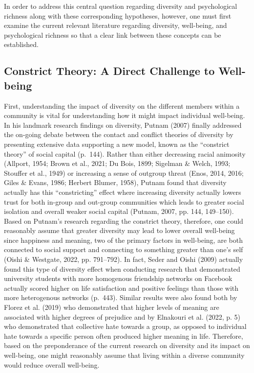 \documentclass[
  man,floatsintext]{apa7}
\begin{document}
In order to address this central question regarding diversity and psychological richness along with these corresponding hypotheses, however, one must first examine the current relevant literature regarding diversity, well-being, and psychological richness so that a clear link between these concepts can be established.

\hypertarget{constrict-theory-a-direct-challenge-to-well-being}{%
\subsection{Constrict Theory: A Direct Challenge to Well-being}\label{constrict-theory-a-direct-challenge-to-well-being}}

First, understanding the impact of diversity on the different members within a community is vital for understanding how it might impact individual well-being. In his landmark research findings on diversity,
Putnam (2007) finally addressed the on-going debate between the contact and conflict theories of diversity by presenting extensive data supporting a new model, known as the ``constrict theory'' of social capital (p.~144). Rather than either decreasing racial animosity (Allport, 1954; Brown et al., 2021; Du Bois, 1899; Sigelman \& Welch, 1993; Stouffer et al., 1949) or increasing a sense of outgroup threat (Enos, 2014, 2016; Giles \& Evans, 1986; Herbert Blumer, 1958), Putnam found that diversity actually has this ``constricting'' effect where increasing diversity actually lowers trust for both in-group and out-group communities which leads to greater social isolation and overall weaker social capital (Putnam, 2007, pp. 144, 149--150). Based on Putnam's research regarding the constrict theory, therefore, one could reasonably assume that greater diversity may lead to lower overall well-being since happiness and meaning, two of the primary factors in well-being, are both connected to social support and connecting to something greater than one's self (Oishi \& Westgate, 2022, pp. 791--792). In fact, Seder and Oishi (2009) actually found this type of diversity effect when conducting research that demonstrated university students with more homogenous friendship networks on Facebook actually scored higher on life satisfaction and positive feelings than those with more heterogenous networks (p.~443). Similar results were also found both by Florez et al. (2019) who demonstrated that higher levels of meaning are associated with higher degrees of prejudice and by Elnakouri et al. (2022, p. 5) who demonstrated that collective hate towards a group, as opposed to individual hate towards a specific person often produced higher meaning in life. Therefore, based on the preponderance of the current research on diversity and its impact on well-being, one might reasonably assume that living within a diverse community would reduce overall well-being.
\end{document}
